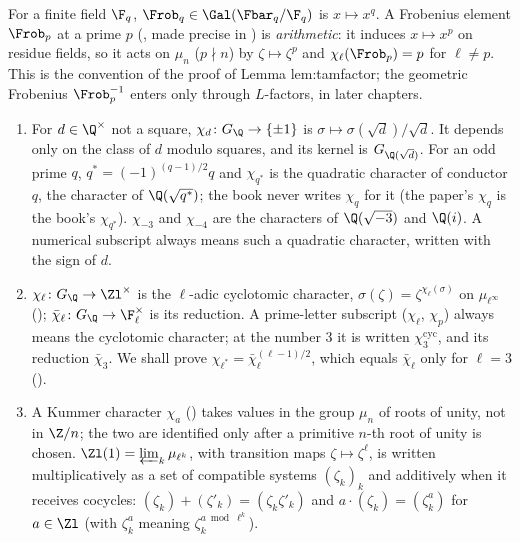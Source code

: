 \begin{convention}\label{conv:galois:frobenius}
For a finite field $\F_q$, $\Frob_q\in\Gal(\Fbar_q/\F_q)$ is $x\mapsto x^q$. A Frobenius element $\Frob_p$ at a prime $p$ (, made
precise in ) is \emph{arithmetic}: it induces $x\mapsto x^p$ on residue fields, so it acts on $\mu_n$ ($p\nmid n$) by $\zeta\mapsto\zeta^p$
and $\chi_\ell(\Frob_p)=p$ for $\ell\ne p$. This is the convention of the proof of Lemma lem:tamfactor; the geometric Frobenius $\Frob_p^{-1}$ enters only
through $L$-factors, in later chapters.
\end{convention}

\begin{convention}[Characters]\label{conv:galois:characters}
\begin{enumerate}[label=(\alph*)]
\item For $d\in\Q^\times$ not a square, $\chi_d\colon G_\Q\to\{\pm1\}$ is $\sigma\mapsto\sigma(\sqrt d)/\sqrt d$. It depends only on the class of $d$
modulo squares, and its kernel is $G_{\Q(\sqrt d)}$. For an odd prime $q$, $q^*=(-1)^{(q-1)/2}q$ and $\chi_{q^*}$ is the quadratic character of conductor $q$,
the character of $\Q(\sqrt{q^*})$; the book never writes $\chi_q$ for it (the paper's $\chi_q$ is the book's $\chi_{q^*}$). $\chi_{-3}$ and $\chi_{-4}$ are the
characters of $\Q(\sqrt{-3})$ and $\Q(i)$. A numerical subscript always means such a quadratic character, written with the sign of $d$.
\item $\chi_\ell\colon G_\Q\to\Zl^\times$ is the $\ell$-adic cyclotomic character, $\sigma(\zeta)=\zeta^{\chi_\ell(\sigma)}$ on $\mu_{\ell^\infty}$
(); $\bar\chi_\ell\colon G_\Q\to\F_\ell^\times$ is its reduction. A prime-letter subscript ($\chi_\ell$, $\chi_p$) always
means the cyclotomic character; at the number $3$ it is written $\chi_3^{\mathrm{cyc}}$, and its reduction $\bar\chi_3$. We shall prove
$\chi_{\ell^*}=\bar\chi_\ell^{(\ell-1)/2}$, which equals $\bar\chi_\ell$ only for $\ell=3$ ().
\item A Kummer character $\chi_a$ () takes values in the group $\mu_n$ of roots of unity, not in $\Z/n$; the two are
identified only after a primitive $n$-th root of unity is chosen. $\Zl(1)=\varprojlim_k\mu_{\ell^k}$, with transition maps $\zeta\mapsto\zeta^\ell$, is
written multiplicatively as a set of compatible systems $(\zeta_k)_k$ and additively when it receives cocycles: $(\zeta_k)+(\zeta'_k)=(\zeta_k\zeta'_k)$ and
$a\cdot(\zeta_k)=(\zeta_k^{a})$ for $a\in\Zl$ (with $\zeta_k^a$ meaning $\zeta_k^{a\bmod\ell^k}$).
\end{enumerate}
\end{convention}

